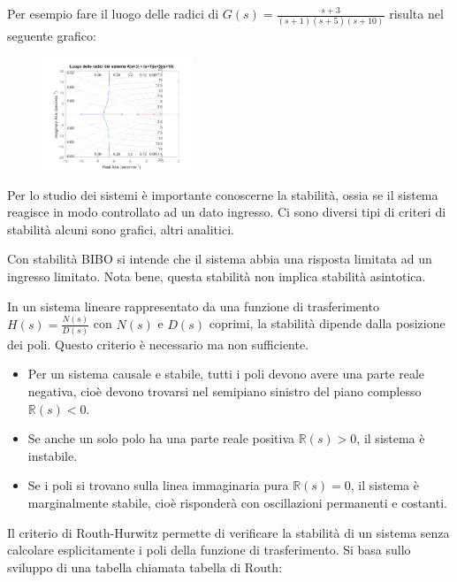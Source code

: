 Per esempio fare il luogo delle radici di $G(s) = \frac{s + 3}{(s + 1)(s + 5)(s + 10)}$ risulta nel seguente grafico:
\begin{figure}[h]
    \centering
    \includegraphics[width=0.4\textwidth]{Immagini/luogo_delle_radici.png}
\end{figure}



Per lo studio dei sistemi è importante conoscerne la stabilità, ossia se il sistema reagisce in modo controllato ad un dato ingresso.
Ci sono diversi tipi di criteri di stabilità alcuni sono grafici, altri analitici.

Con stabilità BIBO si intende che il sistema abbia una risposta limitata ad un ingresso limitato. Nota bene, questa stabilità non implica stabilità asintotica.

In un sistema lineare rappresentato da una funzione di trasferimento \(H(s)=\frac{N(s)}{D(s)}\) con \(N(s)\) e \(D(s)\) coprimi, la stabilità dipende dalla posizione dei poli. Questo criterio è necessario ma non sufficiente.

\begin{itemize}
    \item Per un sistema causale e stabile, tutti i poli devono avere una parte reale negativa, cioè devono trovarsi nel semipiano sinistro del piano complesso \(\mathbb{R}(s)<0\).
    \item Se anche un solo polo ha una parte reale positiva \(\mathbb{R}(s)>0\), il sistema è instabile.
    \item Se i poli si trovano sulla linea immaginaria pura \(\mathbb{R}(s)=0\), il sistema è marginalmente stabile, cioè risponderà con oscillazioni permanenti e costanti.
\end{itemize}


Il criterio di Routh-Hurwitz permette di verificare la stabilità di un sistema senza calcolare esplicitamente i poli della funzione di trasferimento. Si basa sullo sviluppo di una tabella chiamata tabella di Routh:

